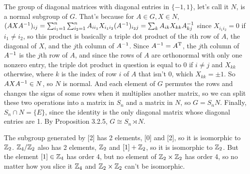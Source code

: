 \documentclass[11pt, oneside]{article}   	%
\begin{document}
The group of diagonal matrices with diagonal entries in $\{-1, 1\}$, let's call it $N$, is a normal subgroup of $G$. That's because for $A \in G, X \in N$, $(AXA^{-1})_{ij} = \sum_{i_1 = 1}^n\sum_{i_2=1}^n A_{ii_1}X_{i_1i_2}(A^{-1})_{i_2j} = \sum_kA_{ik}X_{kk}A^{-1}_{kj}$ since $X_{i_1i_2} = 0$ if $i_1 \not = i_2$, so this product is basically a triple dot product of the $i$th row of $A$, the diagonal of $X$, and the $j$th column of $A^{-1}$. Since $A^{-1} = A^{\text{T}}$, the $j$th column of $A^{-1}$ is the $j$th row of $A$, and since the rows of $A$ are orthonormal with only one nonzero entry, the triple dot product in question is equal to 0 if $i \not = j$ and $X_{kk}$ otherwise, where $k$ is the index of row $i$ of $A$ that isn't 0, which $X_{kk} = \pm 1$. So $AXA^{-1} \in N$, so $N$ is normal. And each element of $G$ permutes the rows and changes the signs of some rows when it multiplies another matrix, so we can split these two operations into a matrix in $S_n$ and a matrix in $N$, so $G = S_nN$. Finally, $S_n \cap N = \{E\}$, since the identity is the only diagonal matrix whose diagonal entries are 1. By Proposition 3.2.5, $G \cong S_n \rtimes N$.
\item The subgroup generated by [2] has 2 elements, [0] and [2], so it is isomorphic to $\mathbb{Z}_2$. $\mathbb{Z}_4 / \mathbb{Z}_2$ also has 2 elements, $\mathbb{Z}_2$ and $[1] + \mathbb{Z}_2$, so it is isomorphic to $\mathbb{Z}_2$. But the element $[1] \in \mathbb{Z}_4$ has order 4, but no element of $\mathbb{Z}_2 \times \mathbb{Z}_2$ has order 4, so no matter how you slice it $\mathbb{Z}_4$ and $\mathbb{Z}_2 \times \mathbb{Z}_2$ can't be isomorphic.
\ee
\end{document}

